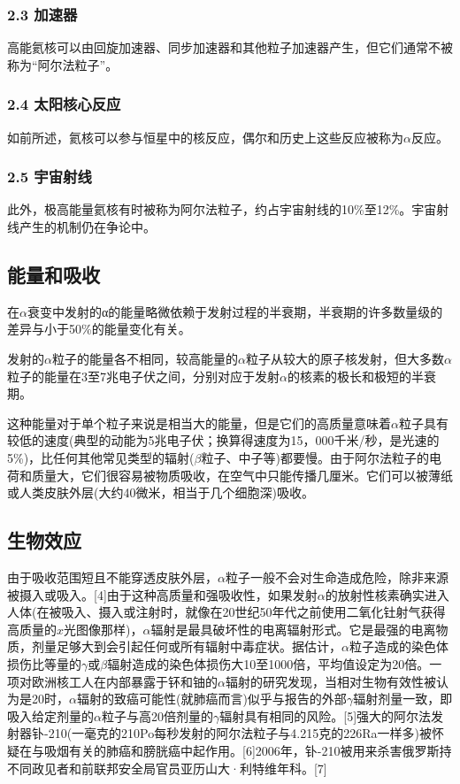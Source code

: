 \subsubsection{2.3 加速器}
高能氦核可以由回旋加速器、同步加速器和其他粒子加速器产生，但它们通常不被称为“阿尔法粒子”。
\subsubsection{2.4 太阳核心反应}
如前所述，氦核可以参与恒星中的核反应，偶尔和历史上这些反应被称为$\alpha$反应。
\subsubsection{2.5 宇宙射线}
此外，极高能量氦核有时被称为阿尔法粒子，约占宇宙射线的10\%至12\%。宇宙射线产生的机制仍在争论中。

\subsection{能量和吸收}
在$\alpha$衰变中发射的α的能量略微依赖于发射过程的半衰期，半衰期的许多数量级的差异与小于50\%的能量变化有关。

发射的$\alpha$粒子的能量各不相同，较高能量的$\alpha$粒子从较大的原子核发射，但大多数$\alpha$粒子的能量在3至7兆电子伏之间，分别对应于发射$\alpha$的核素的极长和极短的半衰期。

这种能量对于单个粒子来说是相当大的能量，但是它们的高质量意味着$\alpha$粒子具有较低的速度(典型的动能为5兆电子伏；换算得速度为15，000千米/秒，是光速的5\%)，比任何其他常见类型的辐射($\beta$粒子、中子等)都要慢。由于阿尔法粒子的电荷和质量大，它们很容易被物质吸收，在空气中只能传播几厘米。它们可以被薄纸或人类皮肤外层(大约40微米，相当于几个细胞深)吸收。

\subsection{生物效应}
由于吸收范围短且不能穿透皮肤外层，$\alpha$粒子一般不会对生命造成危险，除非来源被摄入或吸入。[4]由于这种高质量和强吸收性，如果发射$\alpha$的放射性核素确实进入人体(在被吸入、摄入或注射时，就像在20世纪50年代之前使用二氧化钍射气获得高质量的$x$光图像那样)，$\alpha$辐射是最具破坏性的电离辐射形式。它是最强的电离物质，剂量足够大到会引起任何或所有辐射中毒症状。据估计，$\alpha$粒子造成的染色体损伤比等量的$\gamma$或$\beta$辐射造成的染色体损伤大10至1000倍，平均值设定为20倍。一项对欧洲核工人在内部暴露于钚和铀的$\alpha$辐射的研究发现，当相对生物有效性被认为是20时，$\alpha$辐射的致癌可能性(就肺癌而言)似乎与报告的外部$\gamma$辐射剂量一致，即吸入给定剂量的$\alpha$粒子与高20倍剂量的$\gamma$辐射具有相同的风险。[5]强大的阿尔法发射器钋-210(一毫克的210Po每秒发射的阿尔法粒子与4.215克的226Ra一样多)被怀疑在与吸烟有关的肺癌和膀胱癌中起作用。[6]2006年，钋-210被用来杀害俄罗斯持不同政见者和前联邦安全局官员亚历山大·利特维年科。[7]

